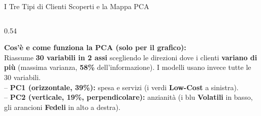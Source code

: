\documentclass[aspectratio=169, 10pt]{beamer}
\newcommand{\card}[3]{%
    \colorbox{#1}{\parbox{\dimexpr#2-2\fboxsep\relax}{\raggedright #3}}%
}
\begin{document}
\begin{frame}{I Tre Tipi di Clienti Scoperti e la Mappa PCA}
\begin{columns}[c, onlytextwidth]
\begin{column}{0.54\textwidth}
            \vspace{1.4mm}
            \card{CardPurple}{\linewidth}{\scriptsize
                \textbf{\color{AccentPurple}\small Cos'è e come funziona la PCA (solo per il grafico):}\\[1.5pt]
                Riassume \textbf{30 variabili in 2 assi} scegliendo le direzioni dove i clienti \textbf{variano di più} (massima varianza, \textbf{58\%} dell'informazione). I modelli usano invece tutte le 30 variabili.\\[1.5pt]
                -- \textbf{PC1 (orizzontale, 39\%):} spesa e servizi (i verdi \textbf{Low-Cost} a sinistra).\\
                -- \textbf{PC2 (verticale, 19\%, perpendicolare):} anzianità (i blu \textbf{Volatili} in basso, gli arancioni \textbf{Fedeli} in alto a destra).
            }
        \end{column}
    \end{columns}
\end{frame}
\end{document}
